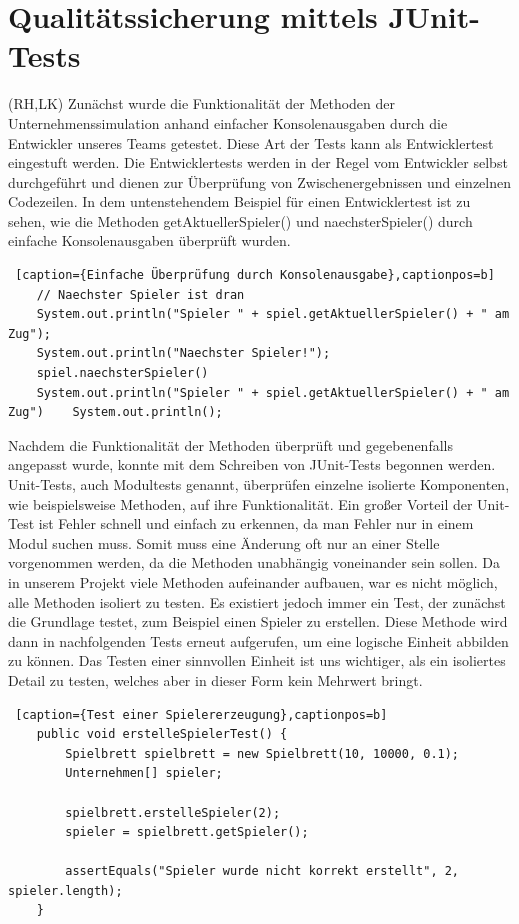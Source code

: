 \clearpage
\chapter{Qualitätssicherung mittels JUnit-Tests}
(RH,LK) Zunächst wurde die Funktionalität der Methoden der Unternehmenssimulation anhand einfacher Konsolenausgaben durch die Entwickler unseres Teams getestet. Diese Art der Tests kann als Entwicklertest eingestuft werden. Die Entwicklertests werden in der Regel vom Entwickler selbst durchgeführt und dienen zur Überprüfung von Zwischenergebnissen und einzelnen Codezeilen. In dem untenstehendem Beispiel für einen Entwicklertest ist zu sehen, wie die Methoden getAktuellerSpieler() und naechsterSpieler() durch einfache Konsolenausgaben überprüft wurden.

\lstset{language=Java}
\begin{lstlisting} [caption={Einfache Überprüfung durch Konsolenausgabe},captionpos=b]
	// Naechster Spieler ist dran 
	System.out.println("Spieler " + spiel.getAktuellerSpieler() + " am Zug");
	System.out.println("Naechster Spieler!");
	spiel.naechsterSpieler()	
	System.out.println("Spieler " + spiel.getAktuellerSpieler() + " am Zug")	System.out.println();
\end{lstlisting}

Nachdem die Funktionalität der Methoden überprüft und gegebenenfalls angepasst wurde, konnte mit dem Schreiben von JUnit-Tests begonnen werden. Unit-Tests, auch Modultests genannt, überprüfen einzelne isolierte Komponenten, wie beispielsweise Methoden, auf ihre Funktionalität. Ein großer Vorteil der Unit-Test ist Fehler schnell und einfach zu erkennen, da man Fehler nur in einem Modul suchen muss. Somit muss eine Änderung oft nur an einer Stelle vorgenommen werden, da die Methoden unabhängig voneinander sein sollen. Da in unserem Projekt viele Methoden aufeinander aufbauen, war es nicht möglich, alle Methoden isoliert zu testen. Es existiert jedoch immer ein Test, der zunächst die Grundlage testet, zum Beispiel einen Spieler zu erstellen. Diese Methode wird dann in nachfolgenden Tests erneut aufgerufen, um eine logische Einheit abbilden zu können. Das Testen einer sinnvollen Einheit ist uns wichtiger, als ein isoliertes Detail zu testen, welches aber in dieser Form kein Mehrwert bringt.


\lstset{language=Java}
\begin{lstlisting} [caption={Test einer Spielererzeugung},captionpos=b]
	public void erstelleSpielerTest() {
		Spielbrett spielbrett = new Spielbrett(10, 10000, 0.1);
		Unternehmen[] spieler;
		
		spielbrett.erstelleSpieler(2);
		spieler = spielbrett.getSpieler();
		
		assertEquals("Spieler wurde nicht korrekt erstellt", 2, spieler.length);
	}
\end{lstlisting}

